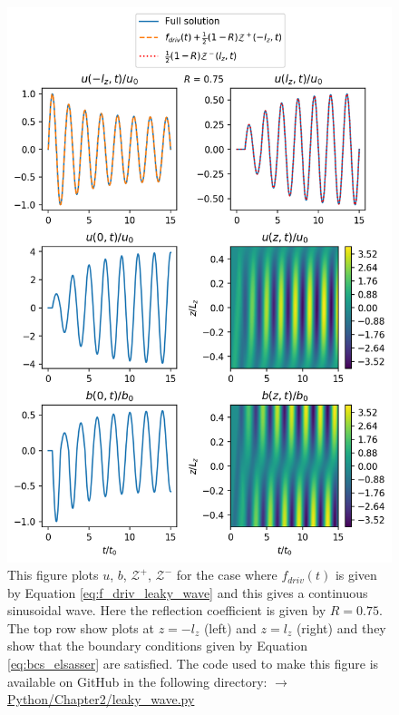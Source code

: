 \begin{figure}
    \centering
    \vspace{-30pt}
    \includegraphics[width=\textwidth,height=0.95\textheight,keepaspectratio]{figures/chapter02/leaky_wave.png}
    \vspace{-10pt}
    \caption{This figure plots $u$, $b$, $\mathcal{Z}^{+}$, $\mathcal{Z^{-}}$ for the case where $f_{driv}(t)$ is given by Equation \eqref{eq:f_driv_leaky_wave} and this gives a continuous sinusoidal wave. Here the reflection coefficient is given by $R=0.75$. The top row show plots at $z=-l_z$ (left) and $z=l_z$ (right) and they show that the boundary conditions given by Equation \eqref{eq:bcs_elsasser} are satisfied. The code used to make this figure is available on GitHub in the following directory:\newline
    \href{https://github.com/aleksyprok/apkp_thesis/blob/main/Python/Chapter2/leaky_wave.py}{$\rightarrow$ Python/Chapter2/leaky\_wave.py}}
    \vspace{-30pt}
    \label{fig:leaky_wave}
\end{figure}

